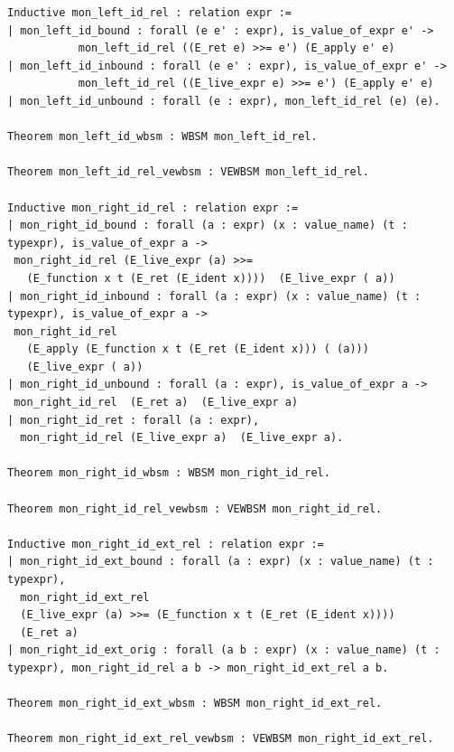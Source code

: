 \documentclass[12pt,twoside,notitlepage]{report}
\theoremstyle{plain}%
\theoremstyle{definition}
\theoremstyle{remark}
\begin{document}
\begin{minipage}{\linewidth}
\begin{lstlisting}[language={Coq}, caption={Monadic left and right ret neutrality}]
Inductive mon_left_id_rel : relation expr :=
| mon_left_id_bound : forall (e e' : expr), is_value_of_expr e' -> 
           mon_left_id_rel ((E_ret e) >>= e') (E_apply e' e)
| mon_left_id_inbound : forall (e e' : expr), is_value_of_expr e' -> 
           mon_left_id_rel ((E_live_expr e) >>= e') (E_apply e' e)
| mon_left_id_unbound : forall (e : expr), mon_left_id_rel (e) (e).

Theorem mon_left_id_wbsm : WBSM mon_left_id_rel.

Theorem mon_left_id_rel_vewbsm : VEWBSM mon_left_id_rel.

Inductive mon_right_id_rel : relation expr :=
| mon_right_id_bound : forall (a : expr) (x : value_name) (t : typexpr), is_value_of_expr a ->
 mon_right_id_rel (E_live_expr (a) >>= 
   (E_function x t (E_ret (E_ident x))))  (E_live_expr ( a))
| mon_right_id_inbound : forall (a : expr) (x : value_name) (t : typexpr), is_value_of_expr a ->
 mon_right_id_rel 
   (E_apply (E_function x t (E_ret (E_ident x))) ( (a)))
   (E_live_expr ( a))
| mon_right_id_unbound : forall (a : expr), is_value_of_expr a ->
 mon_right_id_rel  (E_ret a)  (E_live_expr a)
| mon_right_id_ret : forall (a : expr), 
  mon_right_id_rel (E_live_expr a)  (E_live_expr a).

Theorem mon_right_id_wbsm : WBSM mon_right_id_rel.

Theorem mon_right_id_rel_vewbsm : VEWBSM mon_right_id_rel.

Inductive mon_right_id_ext_rel : relation expr :=
| mon_right_id_ext_bound : forall (a : expr) (x : value_name) (t : typexpr),
  mon_right_id_ext_rel 
  (E_live_expr (a) >>= (E_function x t (E_ret (E_ident x))))  
  (E_ret a)
| mon_right_id_ext_orig : forall (a b : expr) (x : value_name) (t : typexpr), mon_right_id_rel a b -> mon_right_id_ext_rel a b.

Theorem mon_right_id_ext_wbsm : WBSM mon_right_id_ext_rel.

Theorem mon_right_id_ext_rel_vewbsm : VEWBSM mon_right_id_ext_rel.
\end{lstlisting}
\end{minipage}
\end{document}
